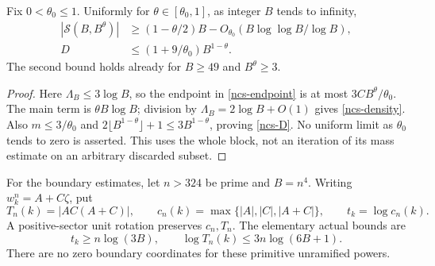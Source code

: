 \begin{corollary}
\label{ncs-theta}
Fix \(0<\theta_0\leq1\). Uniformly for
\(\theta\in[\theta_0,1]\), as integer \(B\) tends to infinity,
\begin{align}
 |\mathcal S(B,B^\theta)|
 &\geq(1-\theta/2)B
          -O_{\theta_0}(B\log\log B/\log B),\label{ncs-density}\\
 D&\leq(1+9/\theta_0)B^{1-\theta}.\label{ncs-D}
\end{align}
The second bound holds already for \(B\geq49\) and \(B^\theta\geq3\).
\end{corollary}
\begin{proof}
Here \(\Lambda_B\leq3\log B\), so the endpoint in
\eqref{ncs-endpoint} is at most \(3CB^\theta/\theta_0\).
The main term is \(\theta B\log B\); division by
\(\Lambda_B=2\log B+O(1)\) gives \eqref{ncs-density}.
Also \(m\leq3/\theta_0\) and
\(2\lfloor B^{1-\theta}\rfloor+1\leq3B^{1-\theta}\), proving
\eqref{ncs-D}. No uniform limit as \(\theta_0\) tends to zero
is asserted. This uses the whole block, not an iteration of its
mass estimate on an arbitrary discarded subset.
\end{proof}

For the boundary estimates, let \(n>324\) be prime and \(B=n^4\).
Writing \(w_k^n=A+C\zeta\), put
\[
 T_n(k)=|AC(A+C)|,\qquad
 c_n(k)=\max\{|A|,|C|,|A+C|\},\qquad t_k=\log c_n(k).
\]
A positive-sector unit rotation preserves \(c_n,T_n\).
The elementary actual bounds are
\[
 t_k\geq n\log(3B),\qquad
 \log T_n(k)\leq3n\log(6B+1).
\]
There are no zero boundary coordinates for these primitive
unramified powers.

